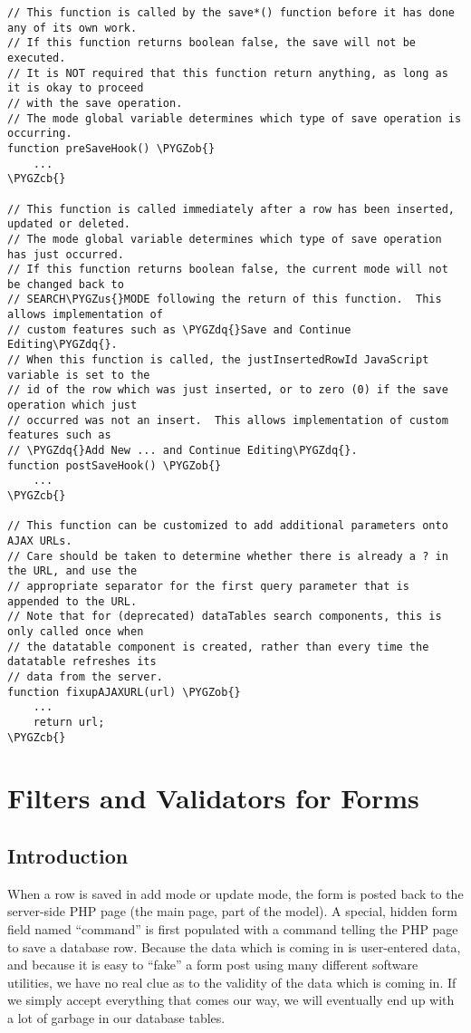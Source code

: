 \documentclass[letterpaper,10pt,english]{sphinxmanual}
\def\PYGZus{\char`\_}
\def\PYGZob{\char`\{}
\def\PYGZcb{\char`\}}
\def\PYGZdq{\char`\"}
\begin{document}
\begin{Verbatim}[commandchars=\\\{\}]
// This function is called by the save*() function before it has done any of its own work.
// If this function returns boolean false, the save will not be executed.
// It is NOT required that this function return anything, as long as it is okay to proceed
// with the save operation.
// The mode global variable determines which type of save operation is occurring.
function preSaveHook() \PYGZob{}
    ...
\PYGZcb{}

// This function is called immediately after a row has been inserted, updated or deleted.
// The mode global variable determines which type of save operation has just occurred.
// If this function returns boolean false, the current mode will not be changed back to
// SEARCH\PYGZus{}MODE following the return of this function.  This allows implementation of
// custom features such as \PYGZdq{}Save and Continue Editing\PYGZdq{}.
// When this function is called, the justInsertedRowId JavaScript variable is set to the
// id of the row which was just inserted, or to zero (0) if the save operation which just
// occurred was not an insert.  This allows implementation of custom features such as
// \PYGZdq{}Add New ... and Continue Editing\PYGZdq{}.
function postSaveHook() \PYGZob{}
    ...
\PYGZcb{}

// This function can be customized to add additional parameters onto AJAX URLs.
// Care should be taken to determine whether there is already a ? in the URL, and use the
// appropriate separator for the first query parameter that is appended to the URL.
// Note that for (deprecated) dataTables search components, this is only called once when
// the datatable component is created, rather than every time the datatable refreshes its
// data from the server.
function fixupAJAXURL(url) \PYGZob{}
    ...
    return url;
\PYGZcb{}
\end{Verbatim}


\chapter{Filters and Validators for Forms}
\label{jaxFrameworkGuide:filters-and-validators-for-forms}

\section{Introduction}
\label{jaxFrameworkGuide:id22}
When a row is saved in add mode or update mode, the form is posted back to the server-side PHP page
(the main page, part of the model).  A special, hidden form field named ``command'' is first populated
with a command telling the PHP page to save a database row.  Because the data which is coming in is
user-entered data, and because it is easy to ``fake'' a form post using many different software
utilities, we have no real clue as to the validity of the data which is coming in.  If we simply
accept everything that comes our way, we will eventually end up with a lot of garbage in our
database tables.
\end{document}

